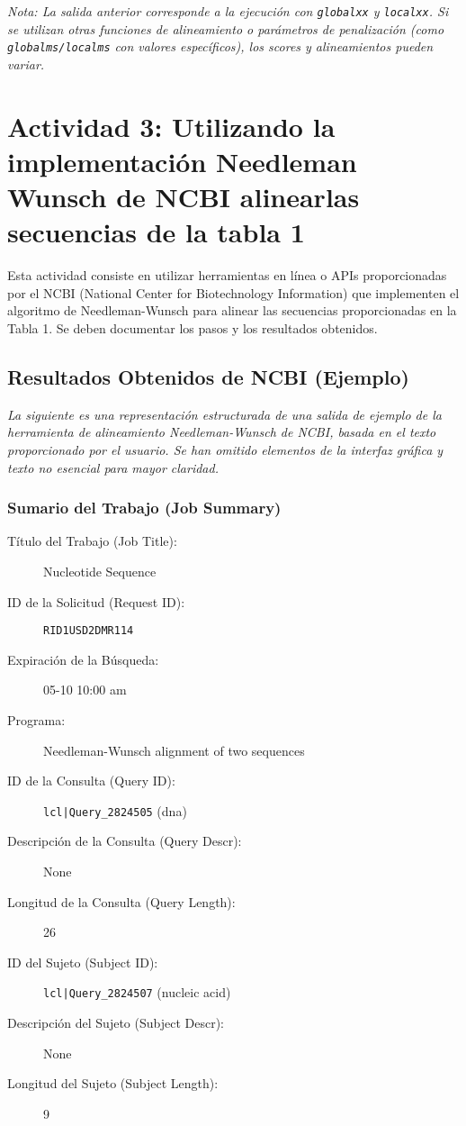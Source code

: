 \documentclass[fleqn,10pt]{article}
\begin{document}
\textit{Nota: La salida anterior corresponde a la ejecución con \texttt{globalxx} y \texttt{localxx}. Si se utilizan otras funciones de alineamiento o parámetros de penalización (como \texttt{globalms/localms} con valores específicos), los scores y alineamientos pueden variar.}

\section{Actividad 3: Utilizando la implementación Needleman Wunsch de NCBI alinearlas secuencias de la tabla 1}
Esta actividad consiste en utilizar herramientas en línea o APIs proporcionadas por el NCBI (National Center for Biotechnology Information) que implementen el algoritmo de Needleman-Wunsch para alinear las secuencias proporcionadas en la Tabla 1. Se deben documentar los pasos y los resultados obtenidos.

\subsection*{Resultados Obtenidos de NCBI (Ejemplo)}
\textit{La siguiente es una representación estructurada de una salida de ejemplo de la herramienta de alineamiento Needleman-Wunsch de NCBI, basada en el texto proporcionado por el usuario. Se han omitido elementos de la interfaz gráfica y texto no esencial para mayor claridad.}

\subsubsection*{Sumario del Trabajo (Job Summary)}
\begin{description}
    \item[Título del Trabajo (Job Title):] Nucleotide Sequence
    \item[ID de la Solicitud (Request ID):] \texttt{RID1USD2DMR114}
    \item[Expiración de la Búsqueda:] 05-10 10:00 am
    \item[Programa:] Needleman-Wunsch alignment of two sequences
    \item[ID de la Consulta (Query ID):] \texttt{lcl|Query\_2824505} (dna)
    \item[Descripción de la Consulta (Query Descr):] None
    \item[Longitud de la Consulta (Query Length):] 26
    \item[ID del Sujeto (Subject ID):] \texttt{lcl|Query\_2824507} (nucleic acid)
    \item[Descripción del Sujeto (Subject Descr):] None
    \item[Longitud del Sujeto (Subject Length):] 9
\end{description}
\end{document}
